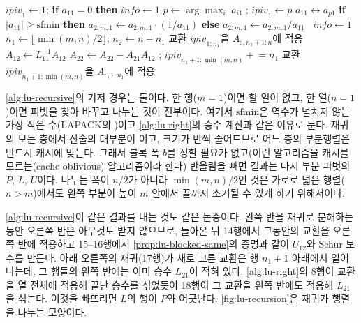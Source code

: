 \begin{algorithm}[t]
\begin{algorithmic}[1]
    \State $\mathit{ipiv}_1\gets1$; \textbf{if} $a_{11}=0$ \textbf{then} $\mathit{info}\gets1$
   
    \State $p\gets\arg\max_i|a_{i1}|$; $\mathit{ipiv}_1\gets p$
      \State $a_{11}\leftrightarrow a_{p1}$
      \State \textbf{if} $|a_{11}|\ge\mathrm{sfmin}$ \textbf{then} $a_{2:m,1}\gets a_{2:m,1}\cdot(1/a_{11})$ \textbf{else} $a_{2:m,1}\gets a_{2:m,1}/a_{11}$
    \Else\ $\mathit{info}\gets1$
    \EndIf
  \Else
    \State $n_1\gets\lfloor\min(m,n)/2\rfloor$; $n_2\gets n-n_1$
    \State {} 
    \State 교환 $\mathit{ipiv}_{1:n_1}$을 $A_{:,n_1+1:n}$에 적용 
    \State $A_{12}\gets L_{11}^{-1}A_{12}$ 
    \State $A_{22}\gets A_{22}-A_{21}A_{12}$ 
    \State {}; $\mathit{ipiv}_{n_1+1:\min(m,n)}\mathrel{+}=n_1$ 
    \State 교환 $\mathit{ipiv}_{n_1+1:\min(m,n)}$을 $A_{:,1:n_1}$에 적용 
  \EndIf
\EndFunction
\end{algorithmic}
\caption{재귀 LU (LAPACK )}
\label{alg:lu-recursive}
\end{algorithm}

\cref{alg:lu-recursive}의 기저 경우는 둘이다. 한 행($m=1$)이면 할 일이 없고, 한 열($n=1$)이면 피벗을 찾아 바꾸고 나누는 것이 전부이다. 여기서 $\mathrm{sfmin}$은 역수가 넘치지 않는 가장 작은 수(LAPACK의 )이고 \cref{alg:lu-right}의 승수 계산과 같은 이유로 둔다. 재귀의 모든 층에서 산술의 대부분이 이고, 크기가 반씩 줄어드므로 어느 층의 부분행렬은 반드시 캐시에 맞는다. 그래서 블록 폭 $b$를 정할 필요가 없고(이런 알고리즘을 캐시를 모르는(cache-oblivious) 알고리즘이라 한다) 반올림을 빼면 결과는 다시 부분 피벗의 $P$, $L$, $U$이다. 나누는 폭이 $n/2$가 아니라 $\min(m,n)/2$인 것은 가로로 넓은 행렬($n>m$)에서도 왼쪽 부분이 높이 $m$ 안에서 끝까지 소거될 수 있게 하기 위해서이다.

\cref{alg:lu-recursive}이 같은 결과를 내는 것도 같은 논증이다. 왼쪽 반을 재귀로 분해하는 동안 오른쪽 반은 아무것도 받지 않으므로, 돌아온 뒤 14행에서 그동안의 교환을 오른쪽 반에 적용하고 15--16행에서 \cref{prop:lu-blocked-same}의 증명과 같이 $U_{12}$와 Schur 보수를 만든다. 아래 오른쪽의 재귀(17행)가 새로 고른 교환은 행 $n_1+1$ 아래에서 일어나는데, 그 행들의 왼쪽 반에는 이미 승수 $L_{21}$이 적혀 있다. \cref{alg:lu-right}의 8행이 교환을 열 전체에 적용해 끝난 승수를 섞었듯이 18행이 그 교환을 왼쪽 반에도 적용해 $L_{21}$을 섞는다. 이것을 빠뜨리면 $L$의 행이 $P$와 어긋난다. \cref{fig:lu-recursion}은 재귀가 행렬을 나누는 모양이다.

